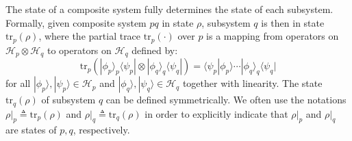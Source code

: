 \documentclass[conference,compsoc, 10pt]{IEEEtran}
\newcommand {\cH } {{\mathcal{H}}}
\newcommand {\rt }[2] {{\left.{#1}\right|_{#2}}}
\newcommand {\tr } {{\mathrm{tr}}}
\def\>{\ensuremath{\rangle}}
\def\<{\ensuremath{\langle}}
\begin{document}
  The state of a composite system fully determines the state of each subsystem.
  Formally, given composite system $pq$ in state $\rho$, subsystem $q$ is then
  in state $\tr_p(\rho)$, where the partial trace $\tr_p(\cdot)$ over $p$ is a
  mapping from operators on $\cH_p\otimes\cH_q$ to operators on $\cH_q$ defined
  by: $$\tr_p(|\phi_p\>_p\<\psi_p|\otimes|\phi_q\>_q\<\psi_q|) =
  \<\psi_p|\phi_p\>\cdots|\phi_q\>_q\<\psi_q|$$  for all
  $|\phi_p\>,|\psi_p\>\in\cH_p$ and $|\phi_q\>,|\psi_q\>\in\cH_q$ together with
  linearity. The state $\tr_q(\rho)$ of subsystem $q$ can be defined
  symmetrically.  We often use the notations $\rt{\rho}{p} \triangleq
  \tr_p(\rho)$ and $\rt{\rho}{q} \triangleq \tr_q(\rho)$ in order to explicitly
  indicate that $\rt{\rho}{p}$ and  $\rt{\rho}{q}$ are states of $p,q$,
  respectively.
	
\end{document}
